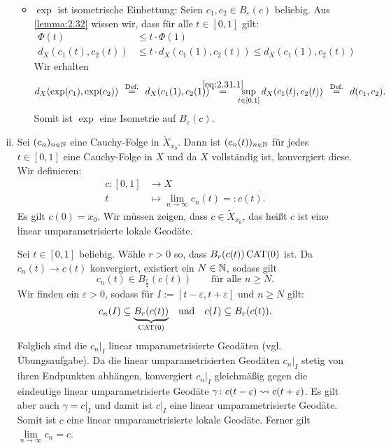 \begin{beweis}
\begin{enumerate}[(i)]
\begin{itemize}
			
			\item $\exp$ ist isometrische Einbettung:
			Seien $c_1,c_2 \in B_\varepsilon(c)$ beliebig.
			Aus \autoref{lemma:2.32} wissen wir, dass für alle $t \in [0,1]$ gilt:
			\begin{align}
				\Phi(t) &\leq t \cdot \Phi(1) \\
				d_X(c_1(t),c_2(t)) &\leq t \cdot d_X(c_1(1),c_2(t)) \leq d_X(c_1(1),c_2(t)) \label{eq:2.31.1}
			\end{align}
			Wir erhalten
			\[
				d_X(\exp(c_1),\exp(c_2)) \stack{\text{Def.}}{=} d_X(c_1(1),c_2(1))  \stack{\eqref{eq:2.31.1}}{=} \sup_{t \in [0,1]} d_X(c_1(t),c_2(t)) \stack{\text{Def.}}{=} d(c_1,c_2).
			\]
			Somit ist $\exp$ eine Isometrie auf $B_\varepsilon(c)$.
		\end{itemize}
		\newpage
		\item Sei $(c_n)_{n \in \mathbb{N}}$ eine Cauchy-Folge in $\tilde{X}_{x_0}$.
		Dann ist $(c_n(t))_{n \in \mathbb{N}}$ für jedes $t \in [0,1]$ eine Cauchy-Folge in $X$ und da $X$ vollständig ist, konvergiert diese.
		Wir definieren:
		\begin{align*}
			c \colon [0,1] &\longrightarrow X \\
			t &\longmapsto \lim\limits_{n \rightarrow \infty} c_n(t) =: c(t).
		\end{align*}
		Es gilt $c(0) = x_0$.
		Wir müssen zeigen, dass $c \in \tilde{X}_{x_0}$, das heißt $c$ ist eine linear umparametrisierte lokale Geodäte.
		
		Sei $t \in [0,1]$ beliebig.
		Wähle  $r > 0$ so, dass $B_r(c(t)) \operatorname{CAT(0)}$ ist.
		Da $c_n(t) \rightarrow c(t)$ konvergiert, existiert ein $N \in \mathbb{N}$, sodass gilt
		\[
			c_n(t) \in B_{\frac{r}{2}}(c(t)) \qquad \text{für alle } n \geq N.
		\]
		Wir finden ein $\varepsilon > 0$, sodass für $I := [t- \varepsilon, t+ \varepsilon]$ und $n \geq N$ gilt:
		\[
			c_n(I) \subseteq {\underbrace{B_r(c(t))}_{\operatorname{CAT(0)}}} \quad \text{und} \quad c(I) \subseteq B_r(c(t)).
		\]
		Folglich sind die $c_n \big|_I$ linear umparametrisierte Geodäten (vgl. Übungsaufgabe).
		Da die linear umparametrisierten Geodäten $c_n \big|_I$ stetig von ihren Endpunkten abhängen, konvergiert $c_n \big|_I$ gleichmäßig gegen die eindeutige linear umparametrisierte Geodäte $\gamma \colon c(t-\varepsilon) \rightsquigarrow c(t+\varepsilon)$.
		Es gilt aber auch $\gamma = c \big|_I$ und damit ist $c \big|_I$ eine linear umparametrisierte Geodäte. Somit ist $c$ eine linear umparametrisierte lokale Geodäte.
		Ferner gilt $\lim\limits_{n \rightarrow \infty} c_n = c$. \qedhere
	\end{enumerate}
\end{beweis}	

